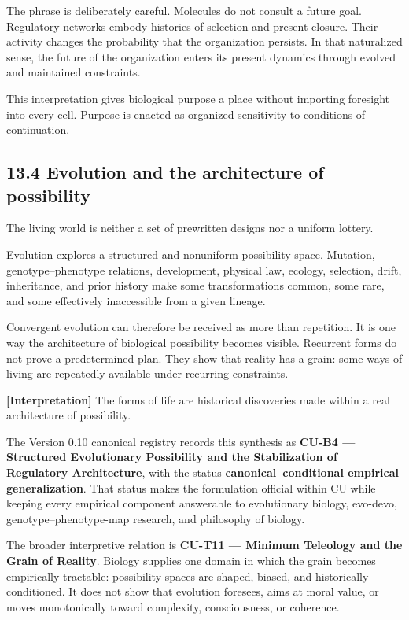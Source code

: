 \documentclass[
  11pt,
]{article}
\begin{document}
The phrase is deliberately careful. Molecules do not consult a future
goal. Regulatory networks embody histories of selection and present
closure. Their activity changes the probability that the organization
persists. In that naturalized sense, the future of the organization
enters its present dynamics through evolved and maintained constraints.

This interpretation gives biological purpose a place without importing
foresight into every cell. Purpose is enacted as organized sensitivity
to conditions of continuation.

\subsection{13.4 Evolution and the architecture of
possibility}\label{evolution-and-the-architecture-of-possibility}

The living world is neither a set of prewritten designs nor a uniform
lottery.

Evolution explores a structured and nonuniform possibility space.
Mutation, genotype--phenotype relations, development, physical law,
ecology, selection, drift, inheritance, and prior history make some
transformations common, some rare, and some effectively inaccessible
from a given lineage.

Convergent evolution can therefore be received as more than repetition.
It is one way the architecture of biological possibility becomes
visible. Recurrent forms do not prove a predetermined plan. They show
that reality has a grain: some ways of living are repeatedly available
under recurring constraints.

\textbf{{[}Interpretation{]}} The forms of life are historical
discoveries made within a real architecture of possibility.

The Version 0.10 canonical registry records this synthesis as
\textbf{CU-B4 --- Structured Evolutionary Possibility and the
Stabilization of Regulatory Architecture}, with the status
\textbf{canonical--conditional empirical generalization}. That status
makes the formulation official within CU while keeping every empirical
component answerable to evolutionary biology, evo-devo,
genotype--phenotype-map research, and philosophy of biology.

The broader interpretive relation is \textbf{CU-T11 --- Minimum
Teleology and the Grain of Reality}. Biology supplies one domain in
which the grain becomes empirically tractable: possibility spaces are
shaped, biased, and historically conditioned. It does not show that
evolution foresees, aims at moral value, or moves monotonically toward
complexity, consciousness, or coherence.
\end{document}
